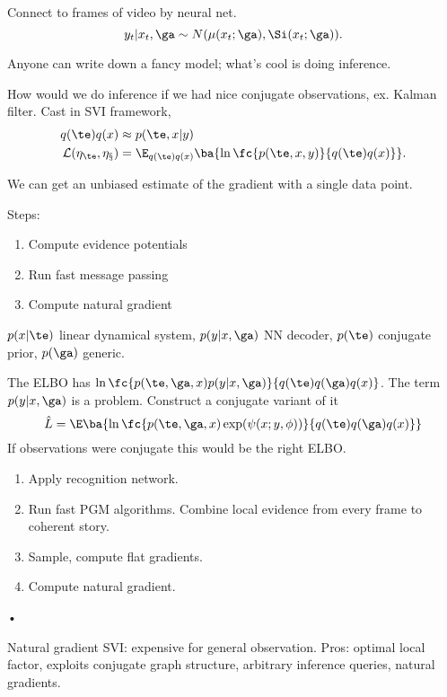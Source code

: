 Connect to frames of video by neural net.
$$y_t|x_t,\ga \sim N(\mu(x_t;\ga), \Si(x_t;\ga)).$$


Anyone can write down a fancy model; what's cool is doing inference.

How would we do inference if we had nice conjugate observations, ex. Kalman filter. Cast in SVI framework, 
\begin{align}
q(\te)q(x) &\approx p(\te,x|y)\\
\cal L(\eta_\te,\eta_x) &= \E_{q(\te)q(x)} \ba{\ln \fc{p(\te,x,y)}{q(\te)q(x)}}.
\end{align}

We can get an unbiased estimate of the gradient with a single data point.

Steps:
\begin{enumerate}
\item
Compute evidence potentials
\item
Run fast message passing
\item
Compute natural gradient
\end{enumerate}


$p(x|\te)$ linear dynamical system, $p(y|x,\ga)$ NN decoder, $p(\te)$ conjugate prior, $p(\ga)$ generic.

The ELBO has $\ln \fc{p(\te, \ga,x)p(y|x,\ga)}{q(\te)q(\ga)q(x)}$. The term $p(y|x,\ga)$ is a problem. 
Construct a conjugate variant of it
$$
\hat L = \E\ba{
\ln \fc{p(\te, \ga,x)\exp(\psi(x;y,\phi))}{q(\te)q(\ga)q(x)}}
$$
If observations were conjugate this would be the right ELBO.

\begin{enumerate}
\item
Apply recognition network.
\item
Run fast PGM algorithms. Combine local evidence from every frame to coherent story.
\item
Sample, compute flat gradients. %
\item
Compute natural gradient.
\end{enumerate}•

Natural gradient SVI: expensive for general observation. Pros: optimal local factor, exploits conjugate graph structure, arbitrary inference queries, natural gradients.

